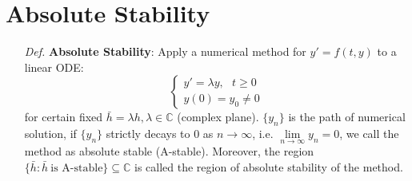 \documentclass[a4paper, 11pt]{article}
\begin{document}
\section{Absolute Stability}
\begin{itemize}
	\item[\textit{Def.}] \textbf{Absolute Stability}: Apply a numerical method for $y'=f(t,y)$ to a linear ODE:
	\begin{equation}
		\begin{cases}
		y' = \lambda y, ~~~t\geq 0\\
		y(0) = y_0 \ne 0
		\end{cases}
	\end{equation}
	for certain fixed $\bar{h} = \lambda h, \lambda \in \mathbb{C}$ (complex plane). $\{y_n\}$ is the path of numerical solution, if $\{y_n\}$ strictly decays to $0$ as $n\to \infty$, i.e. $\lim\limits_{n\rightarrow\infty} y_n =0$, we call the method as absolute stable (A-stable). Moreover, the region $\{\bar{h}: \bar{h}~\text{is A-stable}\} \subseteq \mathbb{C}$ is called the region of absolute stability of the method.
\end{itemize}
\end{document}
